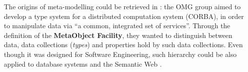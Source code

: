 
The origins of meta-modelling could be retrieved in \cite{omg96}: the OMG group aimed to develop a type system for a distributed computation system (CORBA), in order to manipulate data via ``a common, integrated set of services''. Through the definition of the \textbf{MetaObject Facility}, they wanted to distinguish between data, data collections (\textit{types}) and properties hold by such data collections. Even though it was designed for Software Engineering, such hierarchy could be also applied to database systems \cite{atzeni,encyclopedia} and the Semantic Web \cite{BrasileiroACG16}. 

